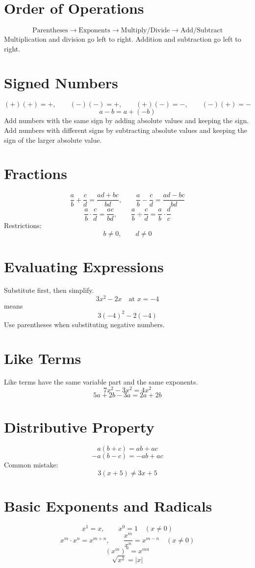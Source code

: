 \documentclass[11pt]{article}
\begin{document}

\section*{Order of Operations}
\[
\text{Parentheses}\rightarrow \text{Exponents}\rightarrow \text{Multiply/Divide}\rightarrow \text{Add/Subtract}
\]
Multiplication and division go left to right. Addition and subtraction go left to right.

\section*{Signed Numbers}
\[
(+)(+)=+,\qquad (-)(-)=+,\qquad (+)(-)=-,\qquad (-)(+)=-
\]
\[
a-b=a+(-b)
\]
Add numbers with the same sign by adding absolute values and keeping the sign. Add numbers with different signs by subtracting absolute values and keeping the sign of the larger absolute value.

\section*{Fractions}
\[
\frac{a}{b}+\frac{c}{d}=\frac{ad+bc}{bd},\qquad
\frac{a}{b}-\frac{c}{d}=\frac{ad-bc}{bd}
\]
\[
\frac{a}{b}\cdot\frac{c}{d}=\frac{ac}{bd},\qquad
\frac{a}{b}\div\frac{c}{d}=\frac{a}{b}\cdot\frac{d}{c}
\]
Restrictions:
\[
b\ne0,\qquad d\ne0
\]

\section*{Evaluating Expressions}
Substitute first, then simplify.
\[
3x^2-2x\quad \text{at }x=-4
\]
means
\[
3(-4)^2-2(-4)
\]
Use parentheses when substituting negative numbers.

\section*{Like Terms}
Like terms have the same variable part and the same exponents.
\[
7x^2-3x^2=4x^2
\]
\[
5a+2b-3a=2a+2b
\]

\section*{Distributive Property}
\[
a(b+c)=ab+ac
\]
\[
-a(b-c)=-ab+ac
\]
Common mistake:
\[
3(x+5)\ne 3x+5
\]

\section*{Basic Exponents and Radicals}
\[
x^1=x,\qquad x^0=1\quad (x\ne0)
\]
\[
x^m\cdot x^n=x^{m+n},\qquad \frac{x^m}{x^n}=x^{m-n}\quad (x\ne0)
\]
\[
(x^m)^n=x^{mn}
\]
\[
\sqrt{x^2}=|x|
\]
\end{document}
